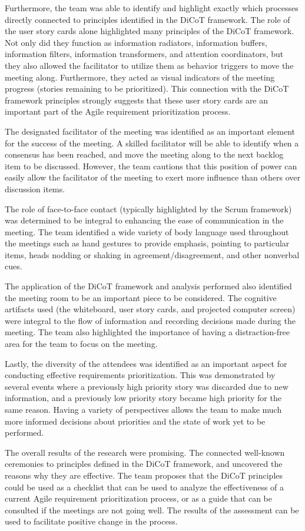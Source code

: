 Furthermore, the team was able to identify and highlight exactly which processes directly connected to principles identified in the DiCoT framework. The role of the user story cards alone highlighted many principles of the DiCoT framework. Not only did they function as information radiators, information buffers, information filters, information transformers, and attention coordinators, but they also allowed the facilitator to utilize them as behavior triggers to move the meeting along.\cite{buchan2020applying} Furthermore, they acted as visual indicators of the meeting progress (stories remaining to be prioritized). This connection with the DiCoT framework principles strongly suggests that these user story cards are an important part of the Agile requirement prioritization process.

The designated facilitator of the meeting was identified as an important element for the success of the meeting. A skilled facilitator will be able to identify when a consensus has been reached, and move the meeting along to the next backlog item to be discussed. However, the team cautions that this position of power can easily allow the facilitator of the meeting to exert more influence than others over discussion items.

The role of face-to-face contact (typically highlighted by the Scrum framework) was determined to be integral to enhancing the ease of communication in the meeting. The team identified a wide variety of body language used throughout the meetings such as hand gestures to provide emphasis, pointing to particular items, heads nodding or shaking in agreement/disagreement, and other nonverbal cues.

The application of the DiCoT framework and analysis performed also identified the meeting room to be an important piece to be considered. The cognitive artifacts used (the whiteboard, user story cards, and projected computer screen) were integral to the flow of information and recording decisions made during the meeting. The team also highlighted the importance of having a distraction-free area for the team to focus on the meeting.

Lastly, the diversity of the attendees was identified as an important aspect for conducting effective requirements prioritization. This was demonstrated by several events where a previously high priority story was discarded due to new information, and a previously low priority story became high priority for the same reason. Having a variety of perspectives allows the team to make much more informed decisions about priorities and the state of work yet to be performed.

The overall results of the research were promising. The connected well-known ceremonies to principles defined in the DiCoT framework, and uncovered the reasons why they are effective. The team proposes that the DiCoT principles could be used as a checklist that can be used to analyze the effectiveness of a current Agile requirement prioritization process, or as a guide that can be consulted if the meetings are not going well. The results of the assessment can be used to facilitate positive change in the process.
